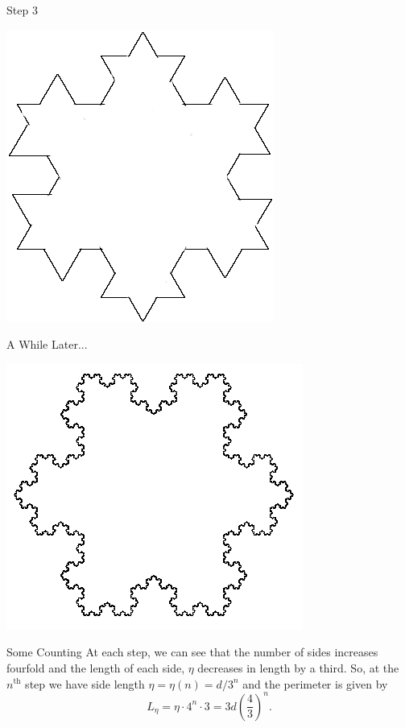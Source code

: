 \documentclass[10pt]{beamer}
\begin{document}
\begin{frame}{Step 3}
  \begin{center}
    \includegraphics[scale=0.5]{./koch/step3.png}
  \end{center}
\end{frame}

\begin{frame}{A While Later...}
  \begin{center}
    \includegraphics[scale=0.5]{./koch/koch-snowflake.png}\\
    \cite{Mathtricks}
  \end{center}
\end{frame}

\begin{frame}{Some Counting}
  At each step, we can see that the number of sides increases fourfold and the length of each side, $\eta$ decreases in length by a third.
  So, at the $n^{\text{th}}$ step we have side length $\eta = \eta(n) = d/3^n$ and the perimeter is given by $$L_{\eta} = \eta\cdot 4^n \cdot 3 = 3d\left(\frac{4}{3}\right)^n.$$
  
\end{frame}
\end{document}
